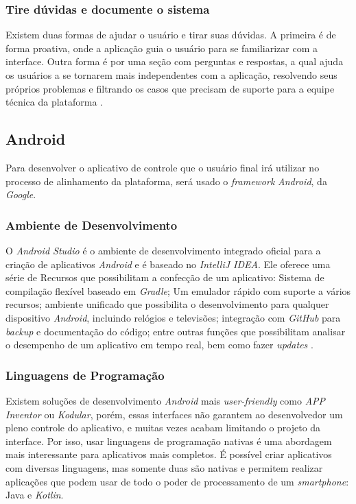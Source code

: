 \subsubsection{Tire dúvidas e documente o sistema}

Existem duas formas de ajudar o usuário e tirar suas dúvidas. A primeira é de forma proativa, onde a aplicação guia o usuário para se familiarizar com a interface. Outra forma é por uma seção com perguntas e respostas, a qual ajuda os usuários a se tornarem mais independentes com a aplicação, resolvendo seus próprios problemas e filtrando os casos que precisam de suporte para a equipe técnica da plataforma \cite{site:nielsenHelpandDoc}.

\subsection{Android}
Para desenvolver o aplicativo de controle que o usuário final irá utilizar no processo de alinhamento da plataforma, será usado o \textit{framework} \textit{Android}, da \textit{Google}.

\subsubsection{Ambiente de Desenvolvimento}

O \textit{Android Studio} é o ambiente de desenvolvimento integrado oficial para a criação de aplicativos \textit{Android} e é baseado no \textit{IntelliJ IDEA}. Ele oferece uma série de Recursos que possibilitam a confecção de um aplicativo: Sistema de compilação flexível baseado em \textit{Gradle}; Um emulador rápido com suporte a vários recursos; ambiente unificado que possibilita o desenvolvimento para qualquer dispositivo \textit{Android}, incluindo relógios e televisões; integração com \textit{GitHub} para \textit{backup} e documentação do código; entre outras funções que possibilitam analisar o desempenho de um aplicativo em tempo real, bem como fazer \textit{updates} \cite{site:androidstudio}.

\subsubsection{Linguagens de Programação}

Existem soluções de desenvolvimento \textit{Android} mais \textit{user-friendly} como \textit{APP Inventor} ou \textit{Kodular}, porém, essas interfaces não garantem ao desenvolvedor um pleno controle do aplicativo, e muitas vezes acabam limitando o projeto da interface. Por isso, usar linguagens de programação nativas é uma abordagem mais interessante para aplicativos mais completos. É possível criar aplicativos com diversas linguagens, mas somente duas são nativas e permitem realizar aplicações que podem usar de todo o poder de processamento de um \textit{smartphone}: Java e \textit{Kotlin}.

